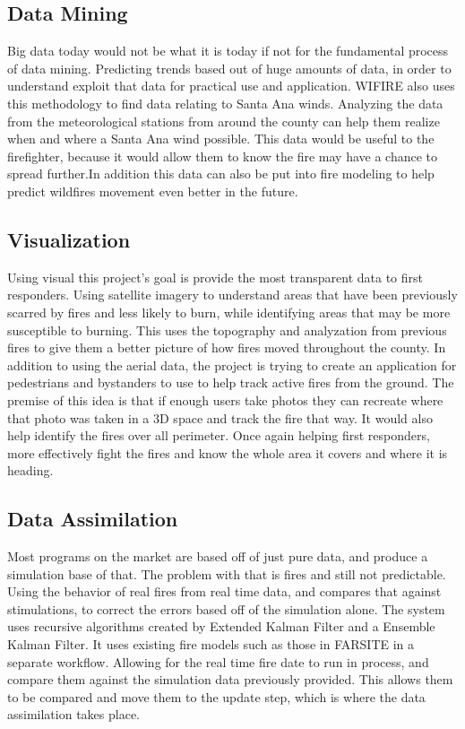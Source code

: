 \documentclass[sigconf]{acmart}
\begin{document}
\subsection{Data Mining}
Big data today would not be what it is today if not for the fundamental process of data mining.  Predicting trends based out of huge amounts of data, in order to understand exploit that data for practical use and application. WIFIRE also uses this methodology to find data relating to Santa Ana winds.  Analyzing the data from the meteorological stations from around the county can help them realize when and where a Santa Ana wind possible. This data would be useful to the firefighter, because it would allow them to know the fire may have a chance to spread further.In addition this data can also be put into fire modeling to help predict wildfires movement even better in the future.

\subsection{Visualization}
Using visual this project's goal is provide the most transparent data to first responders. Using satellite imagery to understand areas that have been previously scarred by fires and less likely to burn, while identifying areas that may be more susceptible to burning.  This uses the topography and analyzation from previous fires to give them a better picture of how fires moved throughout the county.
    In addition to using the aerial data, the project is trying to create an application for pedestrians and bystanders to use to help track active fires from the ground.  The premise of this idea is that if enough users take photos they can recreate where that photo was taken in a 3D space and track the fire that way.  It would also help identify the fires over all perimeter.  Once again helping first responders, more effectively fight the fires and know the whole area it covers and where it is heading.

\subsection{Data Assimilation}
    Most programs on the market are based off of just pure data, and produce a simulation base of that.  The problem with that is fires and still not predictable.  Using the behavior of real fires from real time data, and compares that against stimulations, to correct the errors based off of the simulation alone. The system uses recursive algorithms created by Extended Kalman Filter and a Ensemble Kalman Filter.   It uses existing fire models such as those in FARSITE in a separate workflow.  Allowing for the real time fire date to run in process, and compare them against the simulation data previously provided.  This allows them to be compared and move them to the update step, which is where the data assimilation takes place.
\end{document}
